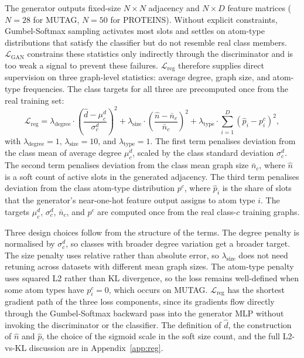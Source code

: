 \documentclass[12pt,a4paper]{article}
\begin{document}
The generator outputs fixed-size $N \times N$ adjacency and $N \times D$ feature matrices ($N = 28$ for MUTAG, $N = 50$ for PROTEINS). Without explicit constraints, Gumbel-Softmax sampling activates most slots and settles on atom-type distributions that satisfy the classifier but do not resemble real class members. $\mathcal{L}_{\text{GAN}}$ constrains these statistics only indirectly through the discriminator and is too weak a signal to prevent these failures. $\mathcal{L}_{\text{reg}}$ therefore supplies direct supervision on three graph-level statistics: average degree, graph size, and atom-type frequencies. The class targets for all three are precomputed once from the real training set:
\begin{equation}
  \mathcal{L}_{\text{reg}} =
  \lambda_{\text{degree}} \cdot \left(\frac{\hat{d} - \mu^d_c}{\sigma^d_c}\right)^2
  + \lambda_{\text{size}} \cdot \left(\frac{\hat{n} - \bar{n}_c}{\bar{n}_c}\right)^2
  + \lambda_{\text{type}} \cdot \sum_{i=1}^{D} \left(\hat{p}_i - p_i^c\right)^2,
  \label{eq:reg}
\end{equation}
with $\lambda_{\text{degree}} = 1$, $\lambda_{\text{size}} = 10$, and $\lambda_{\text{type}} = 1$. The first term penalises deviation from the class mean of average degree $\mu^d_c$, scaled by the class standard deviation $\sigma^d_c$. The second term penalises deviation from the class mean graph size $\bar{n}_c$, where $\hat{n}$ is a soft count of active slots in the generated adjacency. The third term penalises deviation from the class atom-type distribution $p^c$, where $\hat{p}_i$ is the share of slots that the generator's near-one-hot feature output assigns to atom type $i$. The targets $\mu^d_c$, $\sigma^d_c$, $\bar{n}_c$, and $p^c$ are computed once from the real class-$c$ training graphs.

Three design choices follow from the structure of the terms. The degree penalty is normalised by $\sigma^d_c$, so classes with broader degree variation get a broader target. The size penalty uses relative rather than absolute error, so $\lambda_{\text{size}}$ does not need retuning across datasets with different mean graph sizes. The atom-type penalty uses squared L2 rather than KL divergence, so the loss remains well-defined when some atom types have $p_i^c = 0$, which occurs on MUTAG. $\mathcal{L}_{\text{reg}}$ has the shortest gradient path of the three loss components, since its gradients flow directly through the Gumbel-Softmax backward pass into the generator MLP without invoking the discriminator or the classifier. The definition of $\hat{d}$, the construction of $\hat{n}$ and $\hat{p}$, the choice of the sigmoid scale in the soft size count, and the full L2-vs-KL discussion are in Appendix~\ref{app:reg}.
\end{document}
